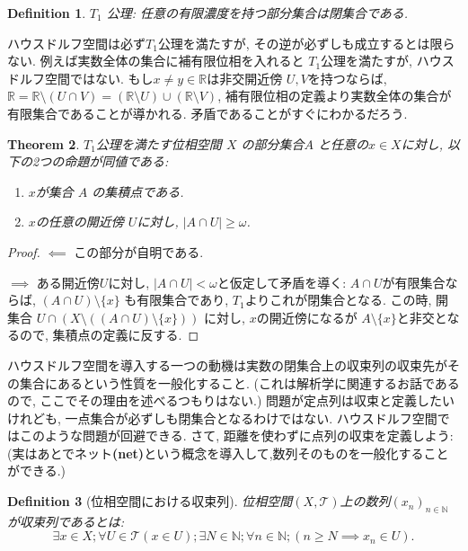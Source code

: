 \documentclass[dvipdfmx]{jbook}
\newtheorem{theorem}{Theorem}[section]
\newtheorem{definition}[theorem]{Definition}
\theoremstyle{remark}
\theoremstyle{plain}
\begin{document}
\begin{definition}
	$T_1$ 公理: 任意の有限濃度を持つ部分集合は閉集合である.
\end{definition}

ハウスドルフ空間は必ず$T_1$公理を満たすが, その逆が必ずしも成立するとは限らない.
例えば実数全体の集合に補有限位相を入れると $T_1$公理を満たすが, ハウスドルフ空間ではない. 
もし$x \neq y \in \mathbb{R}$は非交開近傍 $U,V$を持つならば,
$\mathbb{R} = \mathbb{R} \setminus \left( U \cap V \right) =\left( \mathbb{R} \setminus U \right) \cup \left( \mathbb{R} \setminus V \right) $, 補有限位相の定義より実数全体の集合が有限集合であることが導かれる.
矛盾であることがすぐにわかるだろう.

\begin{theorem}
	\label{thm: limit point}
	$T_1$公理を満たす位相空間 $X$ の部分集合$A$ と任意の$x \in X$に対し, 以下の2つの命題が同値である: 
	\begin{enumerate}
		\item $x$が集合 $A$ の集積点である.
		\item $x$の任意の開近傍 $U$に対し,  $|A\cap U| \ge \omega$.
	\end{enumerate}
\end{theorem}

\begin{proof}
	$\impliedby$ この部分が自明である.

	$\implies$ ある開近傍$U$に対し,  $ |  A \cap U | < \omega $と仮定して矛盾を導く: 
	$A\cap U$が有限集合ならば,  $\left( A \cap U \right) \setminus \{x\} $ も有限集合であり, $T_1$よりこれが閉集合となる. 
	この時, 開集合 $U\cap \left( X \setminus \left( \left( A \cap U \right)  \setminus \{ x\} \right) \right) $ に対し, $x $の開近傍になるが $A \setminus \{x\} $と非交となるので, 集積点の定義に反する.
\end{proof}

ハウスドルフ空間を導入する一つの動機は実数の閉集合上の収束列の収束先がその集合にあるという性質を一般化すること. 
(これは解析学に関連するお話であるので, ここでその理由を述べるつもりはない.)
問題が定点列は収束と定義したいけれども, 一点集合が必ずしも閉集合となるわけではない.
ハウスドルフ空間ではこのような問題が回避できる.
さて, 距離を使わずに点列の収束を定義しよう:(実はあとでネット\textbf{(net)}という概念を導入して,数列そのものを一般化することができる.)

 \begin{definition}[位相空間における収束列]
	位相空間$\left( X ,\mathcal{T} \right) $上の数列$\left( x_n \right) _{n \in \mathbb{N}}$が収束列であるとは:
	\[
	\exists x \in X ; \forall U \in \mathcal{T}\left( x \in U \right) ; \exists N \in \mathbb{N}; \forall n \in \mathbb{N}; \left( n \ge N \implies x_n \in U \right) 
	.\] 
\end{definition}
\end{document}
